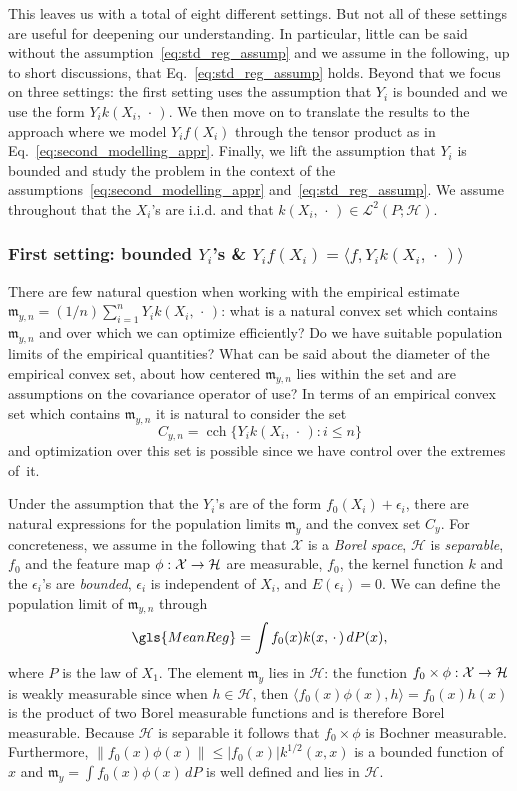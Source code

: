 \documentclass[AHL,Unicode,longabstracts,published]{cedram}
\theoremstyle{remark}
\DeclareMathOperator{\cch}{cch}
\newcommand{\X}{\mathcal{X}}
\newcommand{\cH}{\mathcal{H}}
\newcommand{\clL}{\mathcal{L}}
\newcommand{\mean}{\mathfrak{m}}
\renewcommand*{\to}{\mathchoice{\longrightarrow}{\rightarrow}{\rightarrow}{\rightarrow}}
\begin{document}
This leaves us with a total of eight different settings. But not all of these settings are useful for deepening our understanding. In particular, little can be said without the assumption~\eqref{eq:std_reg_assump} and we assume in the following, up to short discussions, that Eq.~\eqref{eq:std_reg_assump} holds. Beyond that we focus on three settings: the first setting uses the assumption that $Y_i$ is bounded and we use the form $Y_i k(X_i,\,\cdot\,)$. We then move on to translate the results to the approach where we model $Y_i f(X_i)$ through the tensor product as in Eq.~\eqref{eq:second_modelling_appr}. Finally, we lift the assumption that $Y_i$ is bounded and study the problem in the context of the assumptions~\eqref{eq:second_modelling_appr} and~\eqref{eq:std_reg_assump}. We assume throughout that the $X_i$'s are i.i.d. and that $k(X_i,\,\cdot\,) \in
\clL^2(P;\cH)$.



\subsubsection{First setting: bounded \texorpdfstring{$Y_i$}{Y\_i}'s \& \texorpdfstring{$Y_i f(X_i) = \langle f,Y_i k(X_i,\,\cdot\,)\rangle$}{Y\_i f(X\_i) = < f,Y\_i k(X\_i,.)>}} \label{sec:bnd_Y}
There are few natural question when working with the empirical estimate $\mean_{y,n} = (1/n) \sum_{i=1}^n Y_i k(X_i,\,\cdot\,)$: what is a natural convex set which contains $\mean_{y,n}$ and over which we can optimize efficiently? Do we have suitable population limits of the empirical quantities? What can be said about the diameter of the empirical convex set, about how centered $\mean_{y,n}$ lies within the set and are assumptions on the covariance operator of use? In terms of an empirical convex set which contains $\mean_{y,n}$ it is natural to consider the set
\[
C_{y,n} = \cch \{Y_i k(X_i,\,\cdot\,) : i \leq n\}
\]
and optimization over this set is possible since we have control over the extremes of~it.


Under the assumption that the $Y_i$'s are of the form $f_0(X_i) + \epsilon_i$, there are natural expressions for the population limits $\mean_y$ and the convex set $C_y$. For concreteness, we assume in the following that $\X$ is a \emph{Borel space}, $\cH$ is \emph{separable}, $f_0$ and the feature map $\phi:\X \to \cH$ are measurable, $f_0$, the kernel function $k$ and the $\epsilon_i$'s are \emph{bounded}, $\epsilon_i$ is independent of $X_i$, and $E(\epsilon_i) = 0$. We can define the population limit of $\mean_{y,n}$ through
\[
\gls{MeanReg} = \int f_0(x) k(x,\,\cdot\,) \, dP(x),
\]
where $P$ is the law of $X_1$. The element $\mean_y$ lies in $\cH$: the function $f_0 \times \phi : \X \to \cH$ is weakly measurable since when $h \in \cH$, then $\langle f_0(x) \phi(x), h \rangle = f_0(x) h(x)$ is the product of two Borel measurable functions and is therefore Borel measurable. Because $\cH$ is separable it follows that $f_0 \times \phi$ is Bochner measurable. Furthermore, $ \| f_0(x) \phi(x) \| \leq |f_0(x)| k^{1/2}(x,x)$ is a bounded function of $x$ and $\mean_y = \int f_0(x) \phi(x) \,dP$ is well defined and lies in $\cH$.
\end{document}
